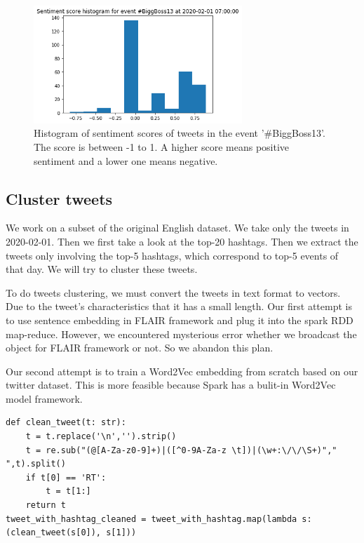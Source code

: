 \begin{figure}[H]
    \centering
    \includegraphics[width=0.7\textwidth]{images/sent1_bigboss.png}
    \caption{Histogram of sentiment scores of tweets in the event  '\#BiggBoss13'. The score is between -1 to 1. A higher score means positive sentiment and a lower one means negative.}
    \label{fig:sent1_bigboss}
\end{figure}


\subsection{Cluster tweets}
We work on a subset of the original English dataset. We take only the tweets in 2020-02-01. Then we first take a look at the top-20 hashtags. Then we extract the tweets only involving the top-5 hashtags, which correspond to top-5 events of that day. We will try to cluster these tweets.

To do tweets clustering, we must convert the tweets in text format to vectors. Due to the tweet's characteristics that it has a small length. Our first attempt is to use sentence embedding in FLAIR framework\cite{akbik2019flair} and plug it into the spark RDD map-reduce. However, we encountered mysterious error whether we broadcast the object for FLAIR framework or not. So we abandon this plan.

Our second attempt is to train a Word2Vec embedding from scratch based on our twitter dataset. This is more feasible because Spark has a bulit-in Word2Vec model framework.

\begin{lstlisting}[caption=data preprocessing, label={datapre}]
def clean_tweet(t: str):
    t = t.replace('\n','').strip()
    t = re.sub("(@[A-Za-z0-9]+)|([^0-9A-Za-z \t])|(\w+:\/\/\S+)"," ",t).split()
    if t[0] == 'RT':
        t = t[1:]
    return t
tweet_with_hashtag_cleaned = tweet_with_hashtag.map(lambda s: (clean_tweet(s[0]), s[1]))
\end{lstlisting}

